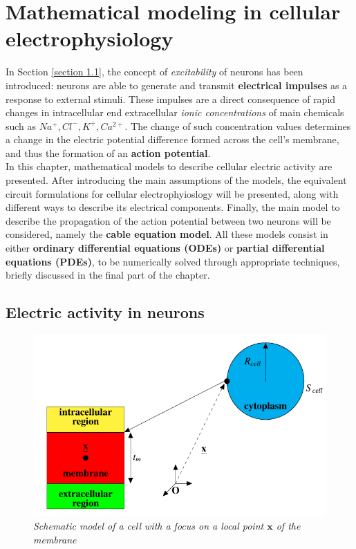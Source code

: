 \documentclass[12pt, a4paper]{report}
\begin{document}
\newpage

\chapter{Mathematical modeling in cellular electrophysiology}

In Section \ref{section 1.1}, the concept of \textit{excitability} of neurons has been introduced: neurons are able to generate and transmit \textbf{electrical impulses} as a response to external stimuli. These impulses are a direct consequence of rapid changes in intracellular end extracellular \textit{ionic concentrations} of main chemicals such as $Na^+, Cl^-, K^+, Ca^{2+}$. The change of such concentration values determines a change in the electric potential difference formed across the cell's membrane, and thus the formation of an \textbf{action potential}. \\
In this chapter, mathematical models to describe cellular electric activity are presented. After introducing the main assumptions of the models, the equivalent circuit formulations for cellular electrophyioslogy will be presented, along with different ways to describe its electrical components. Finally, the main model to describe the propagation of the action potential between two neurons will be considered, namely the \textbf{cable equation model}. All these models consist in either \textbf{ordinary differential equations (ODEs)} or \textbf{partial differential equations (PDEs)}, to be numerically solved through appropriate techniques, briefly discussed in the final part of the chapter.

\section{Electric activity in neurons}


\begin{figure}[H]
	\begin{center}
		\includegraphics[scale=0.7]{first.png} 
	\end{center} 
	\caption{\textit{Schematic model of a cell with a focus on a local point $\textbf{x}$ of the membrane}}
	\label{first}
\end{figure}
\end{document}
